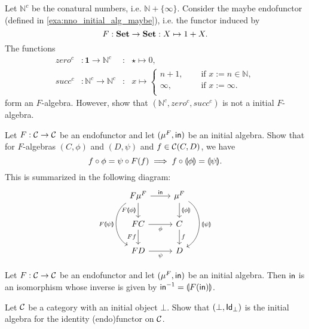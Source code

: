 \begin{exer}\label{exer:conatural_numbers_are_not_initial}
Let $\mathbb{N}^{c}$ be the conatural numbers, i.e. $\mathbb{N} + \{\infty\}$. Consider the maybe endofunctor (defined in \cref{exa:nno_initial_alg_maybe}), i.e. the functor induced by
\[
F : \SET\to\SET : X\mapsto 1 + X.
\]
The functions 
\begin{align*}
zero^{c} &: \mathbf{1}\to \mathbb{N}^{c} &:& \star\mapsto 0,\\
succ^{c} &: \mathbb{N}^{c}\to \mathbb{N}^{c} &:& x\mapsto 
\begin{cases}
n+1,\quad &\text{ if } x := n\in\mathbb{N},\\
\infty,\quad &\text{ if } x := \infty.\\
\end{cases}
\end{align*}
form an $F$-algebra. However, show that $(\mathbb{N}^{c},zero^{c},succ^{c})$ is not a initial $F$-algebra.
\end{exer}

\begin{exer}\label{exer:fusion-property}
  Let $F:\CC\to\CC$ be an endofunctor and let $(\Initalg F, \In)$ be an initial algebra. Show that
  for $F$-algebras $(C,\phi)$ and $(D,\psi)$ and $f\in\CHom{\CC}{C}{D}$, we have 
\[
\co{\phi}{f} = \co{F(f)}{\psi} \implies \co{\catam{\phi}}{f} = \catam{\psi}.
\]
This is summarized in the following diagram:
\begin{equation}\label{eq:initial-f-alg-composition}
\begin{tikzcd}
F\Initalg{F} 
\arrow[r, "\In"] 
\arrow[d,swap, "F\catam{\phi}"]
\ar[dd, bend right=60, "F\catam{\psi}"']
&
\Initalg{F}
\arrow[d, "\catam{\phi}"]
\ar[dd, bend left=60, "\catam{\psi}"]
\\
FC
\arrow[r, swap, "\phi"]
\ar[d, "Ff"'] 
&
C \ar[d, "f"]
\\
FD \ar[r, "\psi"']
&
D
\end{tikzcd}
\end{equation}
\end{exer}

\begin{exer} Let $F:\CC\to\CC$ be an endofunctor and let $(\mu^F, \In)$ be an initial algebra.
  Then $\In$ is an isomorphism whose inverse is given by $\Inv{\In} = \catam{F(\In)}$.
\end{exer}

\begin{exer}\label{exer:initialalg_for_idfun_with_initialob} Let $\CC$ be a category with an initial object $\bot$. Show that $(\bot, \Id[\bot])$ is the initial algebra for the identity (endo)functor on $\CC$.
\end{exer}

